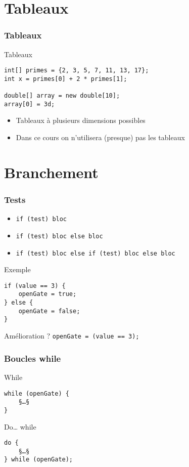 \documentclass[english, french]{beamer}
\begin{document}
\section{Tableaux}
\begin{frame}[fragile]
	\frametitle{Tableaux}
	\begin{block}{Tableaux}
		\begin{lstlisting}
int[] primes = {2, 3, 5, 7, 11, 13, 17};
int x = primes[0] + 2 * primes[1];

double[] array = new double[10];
array[0] = 3d;
		\end{lstlisting}	
	\end{block}
	\begin{itemize}
		\item Tableaux à plusieurs dimensions possibles
		\item Dans ce cours on n’utilisera (presque) pas les tableaux
	\end{itemize}
\end{frame}

\section{Branchement}
\begin{frame}[fragile]
	\frametitle{Tests}
	\begin{itemize}
		\item \texttt{if (test) bloc}
		\item \texttt{if (test) bloc else bloc}
		\item \texttt{if (test) bloc else if (test) bloc else bloc}
	\end{itemize}
	\begin{block}{Exemple}
		\begin{lstlisting}
if (value == 3) {
	openGate = true;
} else {
	openGate = false;
}
		\end{lstlisting}	
	\end{block}
	Amélioration ? \pause \texttt{openGate = (value == 3);}
\end{frame}

\begin{frame}[fragile]
	\frametitle{Boucles while}
	\begin{block}{While}
		\begin{lstlisting}
while (openGate) {
	§…§
}
		\end{lstlisting}	
	\end{block}
	\begin{block}{Do… while}
		\begin{lstlisting}
do {
	§…§
} while (openGate);
		\end{lstlisting}	
	\end{block}
\end{frame}
\end{document}

